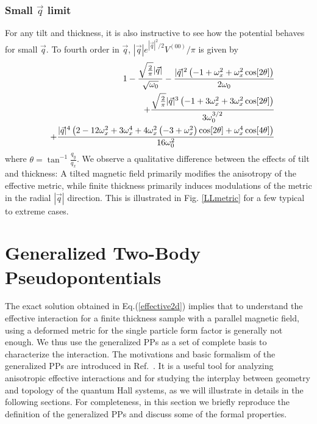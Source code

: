 \documentclass[twocolumn,showpacs,amsmath,amstex,amssymb,mathfonts,prb]{revtex4-1}
\begin{document}
\subsubsection{Small $\vec q$ limit}
For any tilt and thickness, it is also instructive to see how the potential behaves for small $\vec q$. To fourth order in $\vec q$, $|\vec q|e^{|\vec q|^2/2}V^{(00)}/\pi$ is given by
\footnotesize
\begin{eqnarray}
&&1-\frac{\sqrt{\frac{2}{\pi }} |\vec q|}{\sqrt{\omega_0}}-\frac{|\vec q|^2 \left(-1+\omega_x^2+\omega_x^2 \cos [2 \theta ]\right)}{2 \omega_0}\notag\\
&&+\frac{\sqrt{\frac{2}{\pi }} |\vec q|^3 \left(-1+3 \omega_x^2+3 \omega_x^2 \cos [2 \theta ]\right)}{3 \omega_0^{3/2}}\notag\\
&&+\frac{|\vec q|^4 \left(2-12 \omega_x^2+3 \omega_x^4+4 \omega_x^2 \left(-3+\omega_x^2\right) \cos [2 \theta ]+\omega_x^4 \cos [4 \theta ]\right)}{16 \omega_0^2}\notag\\
\end{eqnarray}
\normalsize
where $\theta=\tan^{-1}\frac{q_y}{q_x}$. We observe a qualitative difference between the effects of tilt and thickness: A tilted magnetic field primarily modifies the anisotropy of the effective metric, while finite thickness primarily induces modulations of the metric in the radial $|\vec q|$ direction. This is illustrated in Fig. \ref{LLmetric} for a few typical to extreme cases.


\section{Generalized Two-Body Pseudopontentials}\label{gpp}

The exact solution obtained in Eq.(\ref{effective2d}) implies that to understand the effective interaction for a finite thickness sample with a parallel magnetic field, using a deformed metric for the single particle form factor is generally not enough. We thus use the generalized PPs as a set of complete basis to characterize the interaction. The motivations and basic formalism of the generalized PPs are introduced in Ref.~. It is a useful tool for analyzing anisotropic effective interactions and for studying the interplay between geometry and topology of the quantum Hall systems, as we will illustrate in details in the following sections. For completeness, in this section we briefly reproduce the definition of the generalized PPs and discuss some of the formal properties.
\end{document}
